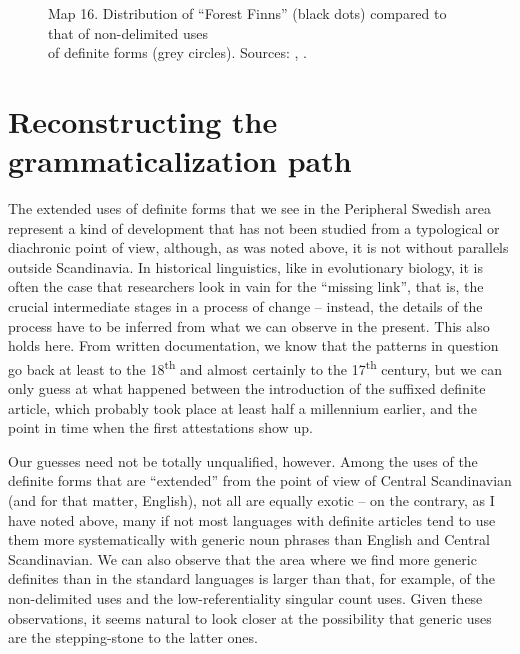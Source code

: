 

\begin{figure}[h]

\begin{minipage}{6.58333in}

\label{bkm:Ref135469955}Map 16. Distribution of “Forest Finns” (black dots) compared to that of non-delimited uses\\
 of definite forms (grey circles). Sources: \citet{Tarkiainen1990}, \citet{Broberg1980}.


\end{minipage}

\end{figure}

\section{ Reconstructing the grammaticalization path}
\label{bkm:Ref154983462}
The extended uses of definite forms that we see in the Peripheral Swedish area represent a kind of development that has not been studied from a typological or diachronic point of view, although, as was noted above, it is not without parallels outside Scandinavia. In historical linguistics, like in evolutionary biology, it is often the case that researchers look in vain for the “missing link”, that is, the crucial intermediate stages in a process of change – instead, the details of the process have to be inferred from what we can observe in the present. This also holds here. From written documentation, we know that the patterns in question go back at least to the 18\textsuperscript{th} and almost certainly to the 17\textsuperscript{th} century, but we can only guess at what happened between the introduction of the suffixed definite article, which probably took place at least half a millennium earlier, and the point in time when the first attestations show up. 


Our guesses need not be totally unqualified, however. Among the uses of the definite forms that are “extended” from the point of view of Central Scandinavian (and for that matter, English), not all are equally exotic – on the contrary, as I have noted above, many if not most languages with definite articles tend to use them more systematically with generic noun phrases than English and Central Scandinavian. We can also observe that the area where we find more generic definites than in the standard languages is larger than that, for example, of the non-delimited uses and the low-referentiality singular count uses. Given these observations, it seems natural to look closer at the possibility that generic uses are the stepping-stone to the latter ones. 

